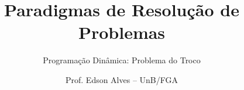 \title{Paradigmas de Resolução de Problemas}
\subtitle{Programação Dinâmica: Problema do Troco}
\author{Prof. Edson Alves -- UnB/FGA}
\date{}
